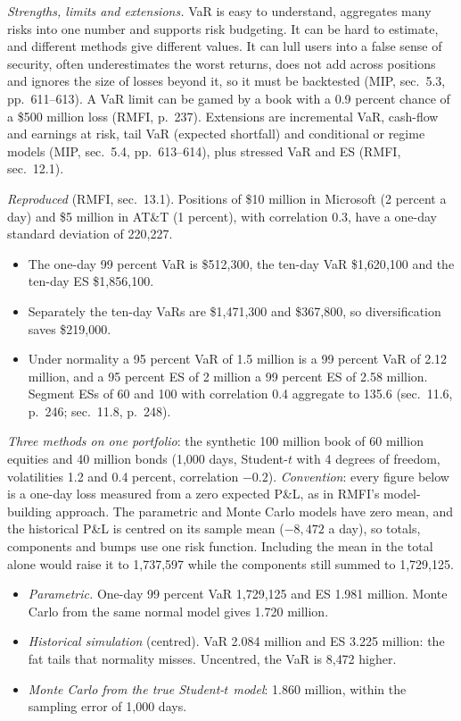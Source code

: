 \begin{qfmethod}
\emph{Strengths, limits and extensions.} VaR is easy to understand, aggregates many risks into one number and supports risk budgeting. It can be hard to estimate, and different methods give different values. It can lull users into a false sense of security, often underestimates the worst returns, does not add across positions and ignores the size of losses beyond it, so it must be backtested (MIP, sec.~5.3, pp.~611--613). A VaR limit can be gamed by a book with a 0.9 percent chance of a \$500 million loss (RMFI, p.~237). Extensions are incremental VaR, cash-flow and earnings at risk, tail VaR (expected shortfall) and conditional or regime models (MIP, sec.~5.4, pp.~613--614), plus stressed VaR and ES (RMFI, sec.~12.1).

 \emph{Reproduced} (RMFI, sec.~13.1). Positions of \$10 million in Microsoft (2 percent a day) and \$5 million in AT\&T (1 percent), with correlation 0.3, have a one-day standard deviation of 220{,}227.
\begin{itemize}
\item The one-day 99 percent VaR is \$512{,}300, the ten-day VaR \$1{,}620{,}100 and the ten-day ES \$1{,}856{,}100.
\item Separately the ten-day VaRs are \$1{,}471{,}300 and \$367{,}800, so diversification saves \$219{,}000.
\item Under normality a 95 percent VaR of 1.5 million is a 99 percent VaR of 2.12 million, and a 95 percent ES of 2 million a 99 percent ES of 2.58 million. Segment ESs of 60 and 100 with correlation 0.4 aggregate to 135.6 (sec.~11.6, p.~246; sec.~11.8, p.~248).
\end{itemize}

\emph{Three methods on one portfolio}: the synthetic 100 million book of 60 million equities and 40 million bonds (1{,}000 days, Student-$t$ with 4 degrees of freedom, volatilities 1.2 and 0.4 percent, correlation $-0.2$). \emph{Convention}: every figure below is a one-day loss measured from a zero expected P\&L, as in RMFI's model-building approach. The parametric and Monte Carlo models have zero mean, and the historical P\&L is centred on its sample mean ($-8{,}472$ a day), so totals, components and bumps use one risk function. Including the mean in the total alone would raise it to 1{,}737{,}597 while the components still summed to 1{,}729{,}125.
\begin{itemize}
\item \emph{Parametric.} One-day 99 percent VaR 1{,}729{,}125 and ES 1.981 million. Monte Carlo from the same normal model gives 1.720 million.
\item \emph{Historical simulation} (centred). VaR 2.084 million and ES 3.225 million: the fat tails that normality misses. Uncentred, the VaR is 8{,}472 higher.
\item \emph{Monte Carlo from the true Student-$t$ model}: 1.860 million, within the sampling error of 1{,}000 days.
\end{itemize}


\end{qfmethod}
